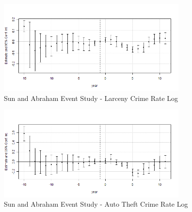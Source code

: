 \documentclass{article}
\begin{document}
\begin{figure}[H]
	\begin{center}
		\includegraphics[width=0.85\textwidth]{larceny}
	\end{center}
	\caption{Sun and Abraham Event Study - Larceny Crime Rate Log}
	\label{fig:larceny_graph}
\end{figure}

\begin{figure}[H]
	\begin{center}
		\includegraphics[width=0.85\textwidth]{autotheft}
	\end{center}
	\caption{Sun and Abraham Event Study - Auto Theft Crime Rate Log}
	\label{fig:autotheft_graph}
\end{figure}
\end{document}
